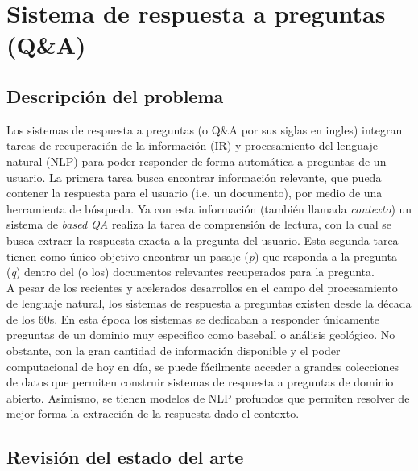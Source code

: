\newpage
\section{Sistema de respuesta a preguntas (Q\&A)}

\subsection{Descripción del problema}

Los sistemas de respuesta a preguntas (o Q\&A por sus siglas en ingles) integran tareas de recuperación de la información (IR) y procesamiento del lenguaje natural (NLP) para poder responder de forma automática a preguntas de un usuario. La primera tarea busca encontrar información relevante, que pueda contener la respuesta para el usuario (i.e. un documento), por medio de una herramienta de búsqueda. Ya con esta información (también llamada \textit{contexto}) un sistema de \textit{based QA} realiza la tarea de comprensión de lectura, con la cual se busca extraer la respuesta exacta a la pregunta del usuario.
Esta segunda tarea tienen como único objetivo encontrar un pasaje (\textit{p}) que responda a la pregunta (\textit{q}) dentro del (o los) documentos relevantes recuperados para la pregunta. \\

A pesar de los recientes y acelerados desarrollos en el campo del procesamiento de lenguaje natural, los sistemas de respuesta a preguntas existen desde la década de los 60s. En esta época los sistemas se dedicaban a responder únicamente preguntas de un dominio muy especifico como baseball o análisis geológico. No obstante, con la gran cantidad de información disponible y el poder computacional de hoy en día, se puede fácilmente acceder a grandes colecciones de datos que permiten construir sistemas de respuesta a preguntas de dominio abierto. Asimismo, se tienen modelos de NLP profundos que permiten resolver de mejor forma la extracción de la respuesta dado el contexto.

\subsection{Revisión del estado del arte}

